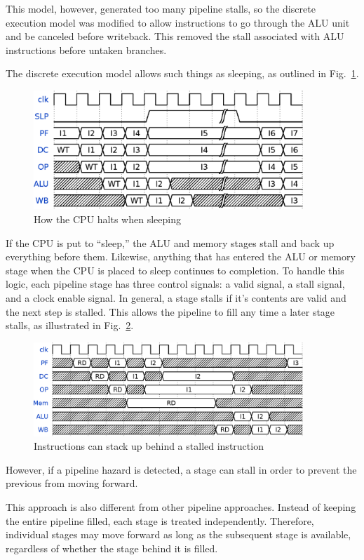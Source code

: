 \documentclass{gqtekspec}
\begin{document}
\begin{itemize}
	This model, however, generated too many pipeline stalls, so the
	discrete execution model was modified to allow instructions to go
	through the ALU unit and be canceled before writeback.  This removed
	the stall associated with ALU instructions before untaken branches.

	The discrete execution model allows such things as sleeping, as
	outlined in Fig.~\ref{fig:sleeping}. 
\begin{figure}\begin{center}
\includegraphics[width=4in]{../gfx/sleep.eps}
\caption{How the CPU halts when sleeping}\label{fig:sleeping}
\end{center}\end{figure}
	If the
	CPU is put to ``sleep,'' the ALU and memory stages stall and back up
	everything before them.  Likewise, anything that has entered the ALU
	or memory stage when the CPU is placed to sleep continues to completion.	
	To handle this logic, each pipeline stage has three control signals:
	a valid signal, a stall signal, and a clock enable signal.  In
	general, a stage stalls if it's contents are valid and the next step
	is stalled.  This allows the pipeline to fill any time a later stage
	stalls, as illustrated in Fig.~\ref{fig:stacking}.
\begin{figure}\begin{center}
\includegraphics[width=4in]{../gfx/stacking.eps}
\caption{Instructions can stack up behind a stalled instruction}\label{fig:stacking}
\end{center}\end{figure}
	However, if a pipeline hazard is detected, a stage can stall in order
	to prevent the previous from moving forward.

	This approach is also different from other pipeline approaches. 
	Instead of keeping the entire pipeline filled, each stage is treated
	independently.  Therefore, individual stages may move forward as long
	as the subsequent stage is available, regardless of whether the stage
	behind it is filled.
\end{itemize}
\end{document}
